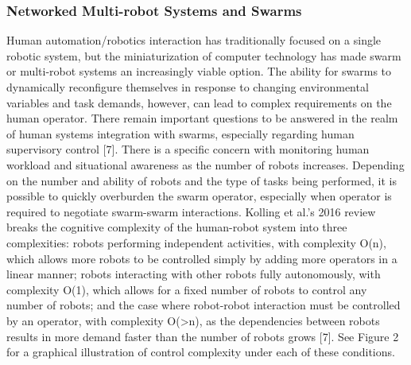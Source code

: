 \subsubsection{Networked Multi-robot Systems and Swarms}
Human automation/robotics interaction has traditionally focused on a single robotic system, but the miniaturization of computer technology has made swarm or multi-robot systems an increasingly viable option. The ability for swarms to dynamically reconfigure themselves in response to changing environmental variables and task demands, however, can lead to complex requirements on the human operator. There remain important questions to be answered in the realm of human systems integration with swarms, especially regarding human supervisory control [7]. There is a specific concern with monitoring human workload and situational awareness as the number of robots increases. Depending on the number and ability of robots and the type of tasks being performed, it is possible to quickly overburden the swarm operator, especially when operator is required to negotiate swarm-swarm interactions. Kolling et al.’s 2016 review breaks the cognitive complexity of the human-robot system into three complexities: robots performing independent activities, with complexity O(n), which allows more robots to be controlled simply by adding more operators in a linear manner; robots interacting with other robots fully autonomously, with complexity O(1), which allows for a fixed number of robots to control any number of robots; and the case where robot-robot interaction must be controlled by an operator, with complexity O(>n), as the dependencies between robots results in more demand faster than the number of robots grows [7]. See Figure 2 for a graphical illustration of control complexity under each of these conditions.

